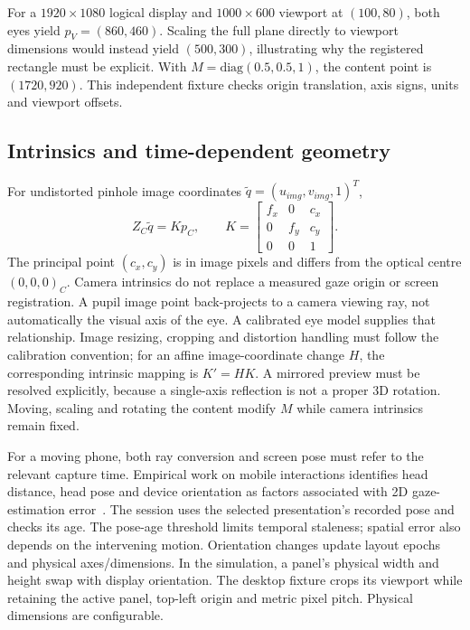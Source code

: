 \documentclass[sigconf,screen,nonacm]{acmart}
\begin{document}
For a $1920\times1080$ logical display and $1000\times600$ viewport at
$(100,80)$, both eyes yield $p_V=(860,460)$. Scaling the full plane directly to
viewport dimensions would instead yield $(500,300)$, illustrating why the
registered rectangle must be explicit. With $M=\mathrm{diag}(0.5,0.5,1)$, the content point is
$(1720,920)$. This independent fixture checks origin translation, axis signs,
units and viewport offsets.

\subsection{Intrinsics and time-dependent geometry}
For undistorted pinhole image coordinates $\tilde q=(u_{img},v_{img},1)^T$,
\begin{equation}
 Z_C\tilde q=Kp_C,\qquad
 K=\begin{bmatrix}f_x&0&c_x\\0&f_y&c_y\\0&0&1\end{bmatrix}.
\end{equation}
The principal point $(c_x,c_y)$ is in image pixels and differs from the optical
centre $(0,0,0)_C$. Camera intrinsics do not replace a measured gaze origin or
screen registration. A pupil image point
back-projects to a camera viewing ray, not automatically the visual axis of the
eye. A calibrated eye model supplies that relationship. Image resizing, cropping
and distortion handling must follow the calibration convention; for an affine
image-coordinate change $H$, the corresponding intrinsic mapping is $K'=HK$.
A mirrored preview must be resolved explicitly, because a single-axis reflection
is not a proper 3D rotation. Moving, scaling and rotating the content modify $M$
while camera intrinsics remain fixed.

For a moving phone, both ray conversion and screen pose must refer to the relevant
capture time. Empirical work on mobile interactions identifies head distance,
head pose and device orientation as factors associated with 2D gaze-estimation
error~\cite{motiongaze}. The session uses the selected presentation's recorded
pose and checks its age. The pose-age threshold limits temporal staleness;
spatial error also depends on the intervening motion. Orientation changes update
layout epochs and physical axes/dimensions. In the simulation, a panel's physical
width and height swap with display orientation. The desktop fixture crops its
viewport while retaining the active panel, top-left origin and metric pixel
pitch. Physical dimensions are configurable.
\end{document}
